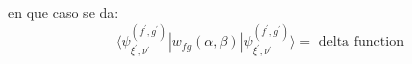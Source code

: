 \documentclass{article}
\begin{document}
en que caso se da:%
\begin{equation*}
\langle \psi _{\xi ^{\prime },\nu ^{\prime }}^{\left( f^{\prime },g^{\prime
}\right) }|w_{fg}\left( \alpha ,\beta \right) |\psi _{\xi ^{\prime },\nu
^{\prime }}^{\left( f^{\prime },g^{\prime }\right) }\rangle =\text{ delta
function}
\end{equation*}
\end{document}
